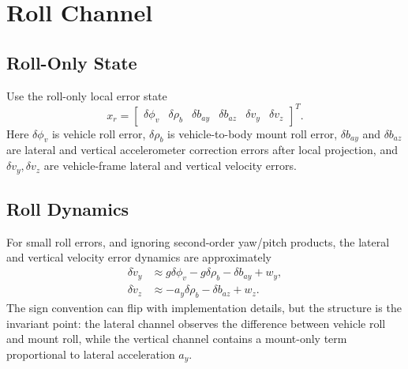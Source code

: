 \documentclass[11pt]{article}
\newcommand{\T}{^{T}}
\newcommand{\phiv}{\delta\phi_v}
\newcommand{\rhom}{\delta\rho_b}
\begin{document}
\section{Roll Channel}

\subsection{Roll-Only State}

Use the roll-only local error state
\begin{equation}
  x_r=
  \begin{bmatrix}
  \phiv & \rhom & \delta b_{ay} & \delta b_{az} & \delta v_y & \delta v_z
  \end{bmatrix}\T .
\end{equation}
Here \(\phiv\) is vehicle roll error, \(\rhom\) is vehicle-to-body mount roll
error, \(\delta b_{ay}\) and \(\delta b_{az}\) are lateral and vertical
accelerometer correction errors after local projection, and
\(\delta v_y,\delta v_z\) are vehicle-frame lateral and vertical velocity
errors.

\subsection{Roll Dynamics}

For small roll errors, and ignoring second-order yaw/pitch products, the
lateral and vertical velocity error dynamics are approximately
\begin{align}
  \delta \dot v_y &\approx g\phiv - g\rhom - \delta b_{ay} + w_y, \label{eq:roll-vy}\\
  \delta \dot v_z &\approx -a_y\rhom - \delta b_{az} + w_z . \label{eq:roll-vz}
\end{align}
The sign convention can flip with implementation details, but the structure is
the invariant point: the lateral channel observes the difference between
vehicle roll and mount roll, while the vertical channel contains a mount-only
term proportional to lateral acceleration \(a_y\).
\end{document}
